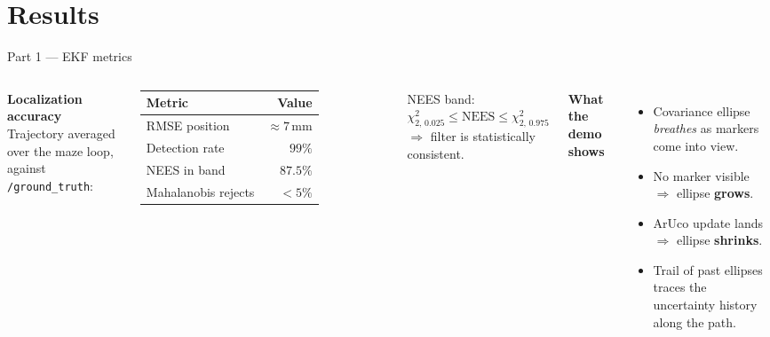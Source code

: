 \documentclass[10pt,aspectratio=169]{beamer}
\begin{document}
\section{Results}

\begin{frame}{Part 1 — EKF metrics}
  \begin{columns}[T,onlytextwidth]
    \textbf{Localization accuracy} \\
    Trajectory averaged over the maze loop, against \texttt{/ground\_truth}:
    \medskip
    \begin{tabular}{lr}
      \toprule
      Metric & Value \\
      \midrule
      RMSE position & $\approx 7$\,mm \\
      Detection rate & $99\%$ \\
      NEES in band & $87.5\%$ \\
      Mahalanobis rejects & $< 5\%$ \\
      \bottomrule
    \end{tabular}

    \medskip
    NEES band: $\chi^2_{2,\,0.025} \leq \mathrm{NEES} \leq \chi^2_{2,\,0.975}$
    \\ $\Rightarrow$ filter is statistically consistent.

    \textbf{What the demo shows}
    \begin{itemize}
      \item Covariance ellipse \emph{breathes} as markers come into view.
      \item No marker visible $\Rightarrow$ ellipse \textbf{grows}.
      \item ArUco update lands $\Rightarrow$ ellipse \textbf{shrinks}.
      \item Trail of past ellipses traces the uncertainty history along
            the path.
    \end{itemize}
  \end{columns}
\end{frame}
\end{document}
